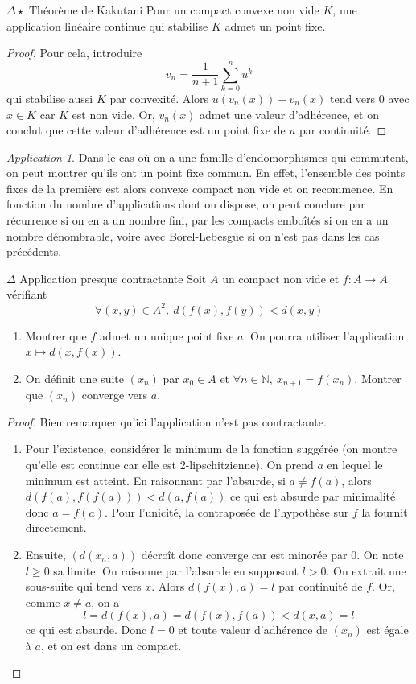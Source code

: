 \documentclass[french,a4paper]{article}
\newcommand{\N}{\mathbb{N}}
\theoremstyle{plain}
\theoremstyle{definition}
\theoremstyle{remark}
\newtheorem*{app}{Application}
\begin{document}
\begin{ex}{$\Delta\star$ Théorème de Kakutani} Pour un compact convexe non vide $K$, une application linéaire continue qui stabilise $K$ admet un point fixe.
\end{ex}
\begin{proof}
	Pour cela, introduire $$v_n=\frac{1}{n+1}\sum_{k=0}^{n}u^k$$ qui stabilise aussi $K$ par convexité. Alors $u(v_n(x))-v_n(x)$ tend vers $0$ avec $x\in K$ car $K$ est non vide. Or, $v_n(x)$ admet une valeur d'adhérence, et on conclut que cette valeur d'adhérence est un point fixe de $u$ par continuité.
\end{proof}
\begin{app}
	Dans le cas où on a une famille d'endomorphismes qui commutent, on peut montrer qu'ils ont un point fixe commun. En effet, l'ensemble des points fixes de la première est alors convexe compact non vide et on recommence. En fonction du nombre d'applications dont on dispose, on peut conclure par récurrence si on en a un nombre fini, par les compacts emboîtés si on en a un nombre dénombrable, voire avec Borel-Lebesgue si on n'est pas dans les cas précédents.
\end{app}

\begin{ex}{$\Delta$ Application presque contractante}
	Soit $A$ un compact non vide et $f:A\to A$ vérifiant $$\forall (x,y)\in A^2,\ d(f(x),f(y))<d(x,y)$$
	\begin{enumerate}
		\item Montrer que $f$ admet un unique point fixe $a$. On pourra utiliser l'application $x\mapsto d(x,f(x))$.
		\item On définit une suite $(x_n)$ par $x_0\in A$ et $\forall n\in\N,\ x_{n+1}=f(x_n)$. Montrer que $(x_n)$ converge vers $a$.
	\end{enumerate}
\end{ex}
\begin{proof}
	Bien remarquer qu'ici l'application n'est pas contractante.
	\begin{enumerate}
		\item Pour l'existence, considérer le minimum de la fonction suggérée (on montre qu'elle est continue car elle est 2-lipschitzienne). On prend $a$ en lequel le minimum est atteint. En raisonnant par l'absurde, si $a\ne f(a)$, alors $d(f(a),f(f(a)))<d(a,f(a))$ ce qui est absurde par minimalité donc $a=f(a)$. Pour l'unicité, la contraposée de l'hypothèse sur $f$ la fournit directement.
		\item Ensuite, $(d(x_n,a))$ décroît donc converge car est minorée par $0$. On note $l\geqslant 0$ sa limite. On raisonne par l'absurde en supposant $l>0$. On extrait une sous-suite qui tend vers $x$. Alors $d(f(x),a)=l$ par continuité de $f$. Or, comme $x\ne a$, on a $$l=d(f(x),a)=d(f(x),f(a))<d(x,a)=l$$ ce qui est absurde. Donc $l=0$ et toute valeur d'adhérence de $(x_n)$ est égale à $a$, et on est dans un compact.
	\end{enumerate}
\end{proof}
\end{document}
